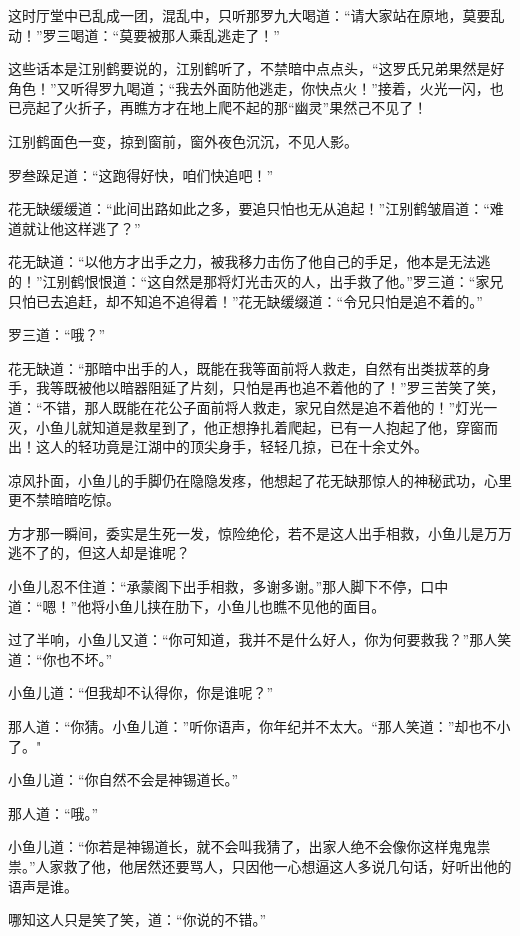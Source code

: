 \documentclass[12pt,oneside]{book}
\begin{document}
这时厅堂中已乱成一团，混乱中，只听那罗九大喝道：``请大家站在原地，莫要乱动！''罗三喝道：``莫要被那人乘乱逃走了！''

这些话本是江别鹤要说的，江别鹤听了，不禁暗中点点头，``这罗氏兄弟果然是好角色！''又听得罗九喝道；``我去外面防他逃走，你快点火！''接着，火光一闪，也已亮起了火折子，再瞧方才在地上爬不起的那``幽灵''果然己不见了！

江别鹤面色一变，掠到窗前，窗外夜色沉沉，不见人影。

罗叁跺足道：``这跑得好快，咱们快追吧！''

花无缺缓缓道：``此间出路如此之多，要追只怕也无从追起！''江别鹤皱眉道：``难道就让他这样逃了？''

花无缺道：``以他方才出手之力，被我移力击伤了他自己的手足，他本是无法逃的！''江别鹤恨恨道：``这自然是那将灯光击灭的人，出手救了他。''罗三道：``家兄只怕已去追赶，却不知追不追得着！''花无缺缓缀道：``令兄只怕是追不着的。''

罗三道：``哦？''

花无缺道：``那暗中出手的人，既能在我等面前将人救走，自然有出类拔萃的身手，我等既被他以暗器阻延了片刻，只怕是再也追不着他的了！''罗三苦笑了笑，道：``不错，那人既能在花公子面前将人救走，家兄自然是追不着他的！''灯光一灭，小鱼儿就知道是救星到了，他正想挣扎着爬起，已有一人抱起了他，穿窗而出！这人的轻功竟是江湖中的顶尖身手，轻轻几掠，已在十余丈外。

凉风扑面，小鱼儿的手脚仍在隐隐发疼，他想起了花无缺那惊人的神秘武功，心里更不禁暗暗吃惊。

方才那一瞬间，委实是生死一发，惊险绝伦，若不是这人出手相救，小鱼儿是万万逃不了的，但这人却是谁呢？

小鱼儿忍不住道：``承蒙阁下出手相救，多谢多谢。''那人脚下不停，口中道：``嗯！''他将小鱼儿挟在肋下，小鱼儿也瞧不见他的面目。

过了半响，小鱼儿又道：``你可知道，我并不是什么好人，你为何要救我？''那人笑道：``你也不坏。''

小鱼儿道：``但我却不认得你，你是谁呢？''

那人道：``你猜。小鱼儿道：''听你语声，你年纪并不太大。``那人笑道：''却也不小了。"

小鱼儿道：``你自然不会是神锡道长。''

那人道：``哦。''

小鱼儿道：``你若是神锡道长，就不会叫我猜了，出家人绝不会像你这样鬼鬼祟祟。''人家救了他，他居然还要骂人，只因他一心想逼这人多说几句话，好听出他的语声是谁。

哪知这人只是笑了笑，道：``你说的不错。''
\end{document}
